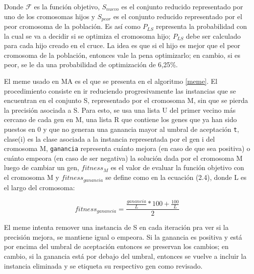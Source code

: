 Donde $\mathcal{F}$ es la función objetivo, $S_{nuevo}$ es el conjunto reducido representado por uno de los cromosomas hijos y $S_{peor}$ es el conjunto reducido representado por el peor cromosoma de la población. Es así como $P_{LS}$ representa la probabilidad con la cual se va a decidir si se optimiza el cromosoma hijo; $P_{LS}$ debe ser calculado para cada hijo creado en el cruce. La idea es que si el hijo es mejor que el peor cromosoma de la población, entonces vale la pena optimizarlo; en cambio, si es peor, se le da una probabilidad de optimización de 6,25\%.

El meme usado en MA es el que se presenta en el algoritmo \ref{meme}. El procedimiento consiste en ir reduciendo progresivamente las instancias que se encuentran en el conjunto S, representado por el cromosoma M, sin que se pierda la precisión asociada a S. Para esto, se usa una lista U del primer vecino más cercano de cada gen en M, una lista R que contiene los genes que ya han sido puestos en 0 y que no generan una ganancia mayor al umbral de aceptación \texttt{t}, clase(i) es la clase asociada a la instancia representada por el gen i del cromosoma M, \texttt{ganancia} representa cuánto mejora (en caso de que sea positiva) o cuánto empeora (en caso de ser negativa) la solución dada por el cromosoma M luego de cambiar un gen, $fitness_M$ es el valor de evaluar la función objetivo con el cromosoma M y $fitness_{ganancia}$ se define como en la ecuación (2.4), donde L es el largo del cromosoma:

\begin{equation}
fitness_{ganancia} = \frac{\frac{ganancia}{L}*100 + \frac{100}{L}}{2}
\end{equation}  

El meme intenta remover una instancia de S en cada iteración pra ver si la precisión mejora, se mantiene igual o empeora. Si la ganancia es positiva y está por encima del umbral de aceptación entonces se preservan los cambios; en cambio, si la ganancia está por debajo del umbral, entonces se vuelve a incluir la instancia eliminada y se etiqueta su respectivo gen como revisado.
 
